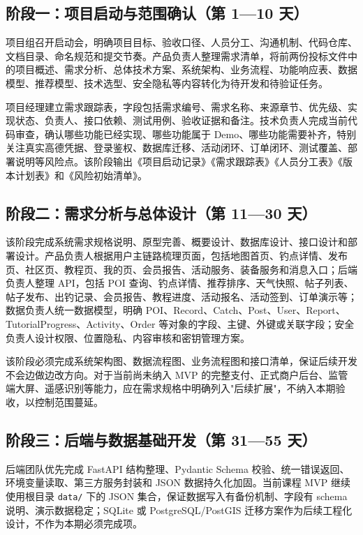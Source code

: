 \subsection{阶段一：项目启动与范围确认（第 1—10 天）}

项目组召开启动会，明确项目目标、验收口径、人员分工、沟通机制、代码仓库、文档目录、命名规范和提交节奏。产品负责人整理需求清单，将前两份投标文件中的项目概述、需求分析、总体技术方案、系统架构、业务流程、功能响应表、数据模型、推荐模型、技术选型、安全隐私等内容转化为待开发和待验证任务。

项目经理建立需求跟踪表，字段包括需求编号、需求名称、来源章节、优先级、实现状态、负责人、接口依赖、测试用例、验收证据和备注。技术负责人完成当前代码审查，确认哪些功能已经实现、哪些功能属于 Demo、哪些功能需要补齐，特别关注真实高德凭据、登录鉴权、数据库迁移、活动闭环、订单闭环、测试覆盖、部署说明等风险点。该阶段输出《项目启动记录》《需求跟踪表》《人员分工表》《版本计划表》和《风险初始清单》。

\subsection{阶段二：需求分析与总体设计（第 11—30 天）}

该阶段完成系统需求规格说明、原型完善、概要设计、数据库设计、接口设计和部署设计。产品负责人根据用户主链路梳理页面，包括地图首页、钓点详情、发布页、社区页、教程页、我的页、会员报告、活动服务、装备服务和消息入口；后端负责人整理 API，包括 POI 查询、钓点详情、推荐排序、天气快照、帖子列表、帖子发布、出钓记录、会员报告、教程进度、活动报名、活动签到、订单演示等；数据负责人统一数据模型，明确 POI、Record、Catch、Post、User、Report、TutorialProgress、Activity、Order 等对象的字段、主键、外键或关联字段；安全负责人设计权限、位置隐私、内容审核和密钥管理方案。

该阶段必须完成系统架构图、数据流程图、业务流程图和接口清单，保证后续开发不会边做边改方向。对于当前尚未纳入 MVP 的完整支付、正式商户后台、监管端大屏、遥感识别等能力，应在需求规格中明确列入"后续扩展"，不纳入本期验收，以控制范围蔓延。

\subsection{阶段三：后端与数据基础开发（第 31—55 天）}

后端团队优先完成 FastAPI 结构整理、Pydantic Schema 校验、统一错误返回、环境变量读取、第三方服务封装和 JSON 数据持久化加固。当前课程 MVP 继续使用根目录 \texttt{data/} 下的 JSON 集合，保证数据写入有备份机制、字段有 schema 说明、演示数据稳定；SQLite 或 PostgreSQL/PostGIS 迁移方案作为后续工程化设计，不作为本期必须完成项。

